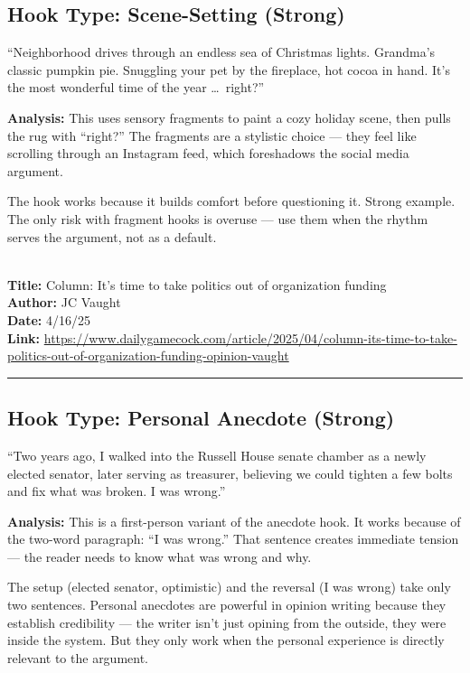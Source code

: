 \documentclass[12pt]{article}
\newcounter{examplenum}
\newcommand{\totalexamples}{10}
\newcommand{\exampleheader}[4]{%
    \newpage
    \stepcounter{examplenum}%
    \noindent{\large\bfseries\color{garnet} Example \theexamplenum\ of \totalexamples}\\[6pt]
    \textbf{Title:} #1\\
    \textbf{Author:} #2\\
    \textbf{Date:} #3\\
    \textbf{Link:} \url{#4}\\[4pt]
    \noindent\rule{\textwidth}{0.4pt}
    \vspace{6pt}
}
\begin{document}
\subsection*{Hook Type: Scene-Setting (Strong)}

\begin{promptbox}
``Neighborhood drives through an endless sea of Christmas lights. Grandma's classic pumpkin pie. Snuggling your pet by the fireplace, hot cocoa in hand. It's the most wonderful time of the year \ldots\ right?''
\end{promptbox}

\textbf{Analysis:} This uses sensory fragments to paint a cozy holiday scene, then pulls the rug with ``right?'' The fragments are a stylistic choice --- they feel like scrolling through an Instagram feed, which foreshadows the social media argument.

The hook works because it builds comfort before questioning it. Strong example. The only risk with fragment hooks is overuse --- use them when the rhythm serves the argument, not as a default.

\exampleheader
{Column: It's time to take politics out of organization funding}
{JC Vaught}
{4/16/25}
{https://www.dailygamecock.com/article/2025/04/column-its-time-to-take-politics-out-of-organization-funding-opinion-vaught}

\subsection*{Hook Type: Personal Anecdote (Strong)}

\begin{promptbox}
``Two years ago, I walked into the Russell House senate chamber as a newly elected senator, later serving as treasurer, believing we could tighten a few bolts and fix what was broken. I was wrong.''
\end{promptbox}

\textbf{Analysis:} This is a first-person variant of the anecdote hook. It works because of the two-word paragraph: ``I was wrong.'' That sentence creates immediate tension --- the reader needs to know what was wrong and why.

The setup (elected senator, optimistic) and the reversal (I was wrong) take only two sentences. Personal anecdotes are powerful in opinion writing because they establish credibility --- the writer isn't just opining from the outside, they were inside the system. But they only work when the personal experience is directly relevant to the argument.
\end{document}
